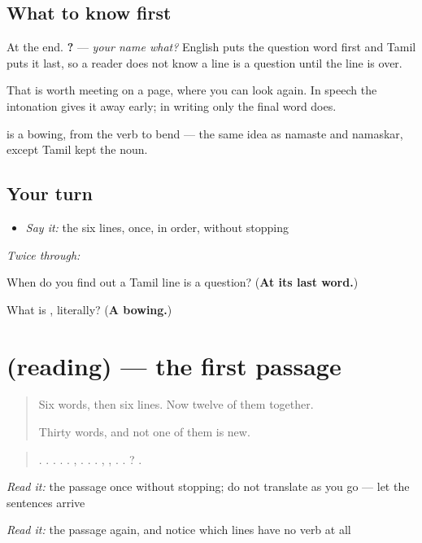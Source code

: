 \subsection*{What to know first}
At the end. \textbf{  ?} — \emph{your name what?} English puts the question word first and Tamil puts it last, so a reader does not know a line is a question until the line is over.

That is worth meeting on a page, where you can look again. In speech the intonation gives it away early; in writing only the final word does.

\textbf{} is a bowing, from the verb to bend — the same idea as namaste and namaskar, except Tamil kept the noun.

\subsection*{Your turn}
\begin{itemize}
\raggedright
  \item \emph{Say it:} the six lines, once, in order, without stopping
\end{itemize}

\emph{Twice through:}

\begin{tcolorbox}[breakable,colback=teal!4,colframe=teal!35!black,title={Before you move on}]
When do you find out a Tamil line is a question? (\textbf{At its last word.})

What is \textbf{}, literally? (\textbf{A bowing.})
\end{tcolorbox}
\section[(reading)]{(reading) — the first passage}

\label{lesson:TA-C84-mudhal-vaasippu}



\begin{quote}
Six words, then six lines. Now twelve of them together.

Thirty words, and not one of them is new.
\end{quote}

\begin{tcolorbox}[breakable,skin=enhanced,colback=orange!6,colframe=orange!45!black,boxrule=0.5pt,arc=1mm,left=6pt,right=6pt,top=4pt,bottom=4pt,fonttitle=\bfseries,title={Read this}]
\begin{quote}
.   .   .  .   .  ,  .  .  . , , .   .   ? .
\end{quote}

\emph{Read it:} the passage once without stopping; do not translate as you go — let the sentences arrive

\emph{Read it:} the passage again, and notice which lines have no verb at all
\end{tcolorbox}

